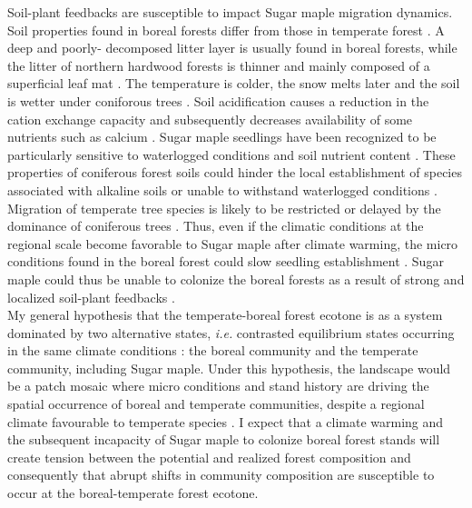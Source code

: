 Soil-plant feedbacks are susceptible to impact Sugar maple migration dynamics.
Soil properties found in boreal forests differ from those in temperate forest
\cite{Lafleur2010,Barras1998,Goldblum2010,Demers1998}. A deep and poorly-
decomposed litter layer is usually found in boreal forests, while the litter
of  northern hardwood forests is thinner and mainly composed of a superficial
leaf mat \cite{Barras1998}. The temperature is colder, the snow melts later
and the soil is wetter under coniforous trees \cite{Lafleur2010,Goldblum2010}.
Soil acidification causes a reduction in the cation exchange capacity and
subsequently decreases availability of some nutrients such as calcium
\cite{Moore2008}. Sugar maple seedlings have been recognized to be
particularly sensitive to waterlogged conditions and soil nutrient content
\cite{Moore2008,Lafleur2010,Cleavitt2011}. These properties of coniferous
forest soils could hinder the local establishment of species associated with
alkaline soils or unable to withstand waterlogged conditions
\cite{Lafleur2010}. Migration of temperate tree species is likely to be
restricted or delayed by the dominance of coniferous trees \cite{Lafleur2010}.
Thus, even if the climatic conditions at the regional scale become favorable
to Sugar maple after climate warming, the micro conditions found in the boreal
forest could slow seedling establishment
\cite{Kellman2004,Moore2008,Barras1998,Messier2011}. Sugar maple could thus be
unable to colonize the boreal forests as a result of strong and localized
soil-plant feedbacks \cite{McCarthyNeumann2012}.\\

My general hypothesis that the temperate-boreal forest ecotone is as a system
dominated by two alternative states, \textit{i.e.} contrasted equilibrium states occurring
in the same climate conditions \cite{scheffer2009critical}: the boreal
community and the temperate community, including Sugar maple. Under this hypothesis, the landscape would be
a patch mosaic where micro conditions and stand history are driving the spatial
occurrence of boreal and temperate communities, despite a regional climate
favourable to temperate species \cite{Goldblum2010,Fisichelli2013}. I expect
that a climate warming and the subsequent incapacity of Sugar maple to
colonize boreal forest stands will create  tension between the potential and
realized forest composition and consequently that abrupt shifts in community
composition are susceptible to occur at the boreal-temperate forest ecotone.\\

